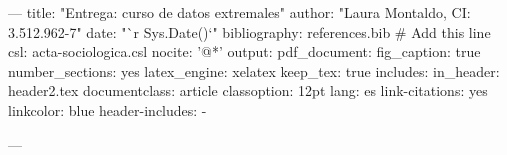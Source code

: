 ---
title: "Entrega: curso de datos extremales"
author: "Laura Montaldo, CI: 3.512.962-7"
date: "`r Sys.Date()`"
bibliography: references.bib  # Add this line
csl: acta-sociologica.csl
nocite: '@*'
output:
  pdf_document:
    fig_caption: true
    number_sections: yes
    latex_engine: xelatex
    keep_tex: true
    includes:
      in_header: header2.tex
documentclass: article
classoption: 12pt
lang: es
link-citations: yes
linkcolor: blue
header-includes:
  - \usepackage{amsthm}
---

\usepackage{makeidx}
\makeindex
\usepackage{graphicx}
\usepackage{tikz}
\usepackage{atbegshi}

